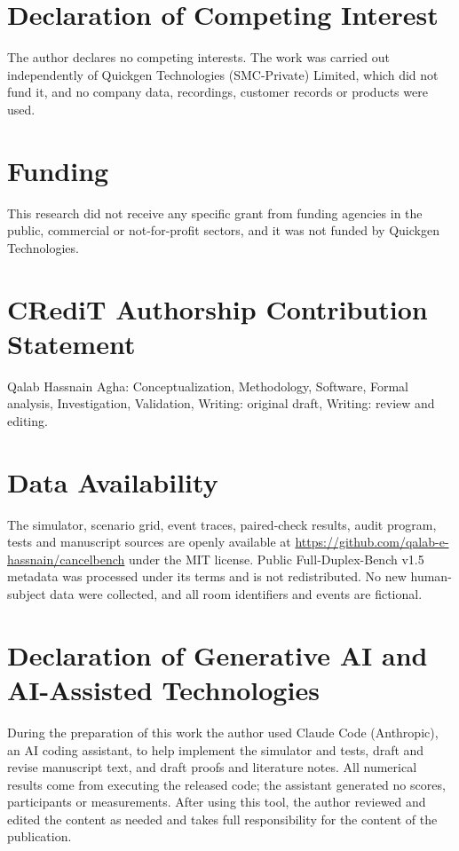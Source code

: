 \documentclass[11pt]{article}
\begin{document}
\section*{Declaration of Competing Interest}

The author declares no competing interests. The work was carried out independently of Quickgen Technologies (SMC-Private) Limited, which did not fund it, and no company data, recordings, customer records or products were used.


\section*{Funding}

This research did not receive any specific grant from funding agencies in the public, commercial or not-for-profit sectors, and it was not funded by Quickgen Technologies.


\section*{CRediT Authorship Contribution Statement}

Qalab Hassnain Agha: Conceptualization, Methodology, Software, Formal analysis, Investigation, Validation, Writing: original draft, Writing: review and editing.


\section*{Data Availability}

The simulator, scenario grid, event traces, paired-check results, audit program, tests and manuscript sources are openly available at \url{https://github.com/qalab-e-hassnain/cancelbench} under the MIT license. Public Full-Duplex-Bench v1.5 metadata was processed under its terms and is not redistributed. No new human-subject data were collected, and all room identifiers and events are fictional.


\section*{Declaration of Generative AI and AI-Assisted Technologies}

During the preparation of this work the author used Claude Code (Anthropic), an AI coding assistant, to help implement the simulator and tests, draft and revise manuscript text, and draft proofs and literature notes. All numerical results come from executing the released code; the assistant generated no scores, participants or measurements. After using this tool, the author reviewed and edited the content as needed and takes full responsibility for the content of the publication.
\end{document}
